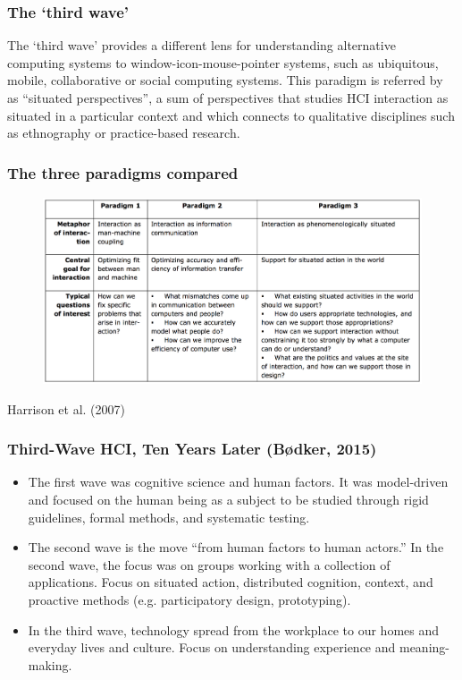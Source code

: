 \documentclass[screen, aspectratio=43]{beamer}
\begin{document}
%
\begin{frame}
\frametitle{The `third wave'}
The `third wave' provides a different lens for understanding alternative computing systems to window-icon-mouse-pointer systems, such as ubiquitous, mobile, collaborative or social computing systems. This paradigm is referred by~\cite{Harrison.et.al.2007.three} as “situated perspectives”, a sum of perspectives that studies HCI interaction as situated in a particular context and which connects to qualitative disciplines such as ethnography or practice-based research.
\end{frame}
%
\begin{frame}
\frametitle{The three paradigms compared}
\begin{figure}
\includegraphics[scale=0.18]{img/the-three-HCI-paradigms.png}
\end{figure}
{\scriptsize Harrison et al. (2007) \cite{Harrison.et.al.2007.three}}
\end{frame}
%
\begin{frame}
\frametitle{Third-Wave HCI, Ten Years Later (Bødker, 2015)}
{\small
\begin{itemize}
\item The first wave was cognitive science and human factors. It was model-driven and focused on the human being as a subject to be studied through rigid guidelines, formal methods, and systematic testing. \cite{Bodker.2015.third}
\item The second wave is the move ``from human factors to human actors.'' In the second wave, the focus was on groups working with a collection of applications. Focus on situated action, distributed cognition, context, and proactive methods (e.g. participatory design, prototyping). \cite{Bodker.2015.third}
\item  In the third wave, technology spread from the workplace to our homes and everyday lives and culture. Focus on understanding experience and meaning-making. \cite{Bodker.2015.third}
\end{itemize}
}
\end{frame}
\end{document}
